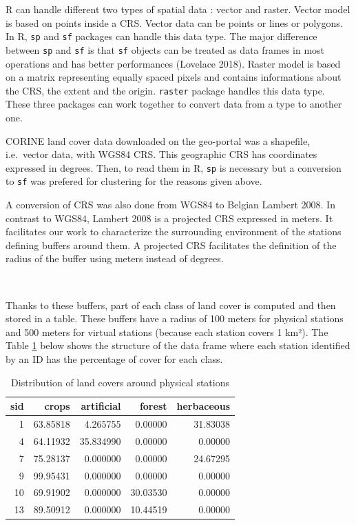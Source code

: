 \documentclass[12pt,twoside]{reedthesis}
\theoremstyle{definition}
\theoremstyle{definition}
\theoremstyle{definition}
\theoremstyle{remark}
\begin{document}
R can handle different two types of spatial data : vector and raster.
Vector model is based on points inside a CRS. Vector data can be points
or lines or polygons. In R, \texttt{sp} and \texttt{sf} packages can
handle this data type. The major difference between \texttt{sp} and
\texttt{sf} is that \texttt{sf} objects can be treated as data frames in
most operations and has better performances (Lovelace 2018). Raster
model is based on a matrix representing equally spaced pixels and
contains informations about the CRS, the extent and the origin.
\texttt{raster} package handles this data type. These three packages can
work together to convert data from a type to another one.

CORINE land cover data downloaded on the geo-portal was a shapefile,
i.e.~vector data, with WGS84 CRS. This geographic CRS has coordinates
expressed in degrees. Then, to read them in R, \texttt{sp} is necessary
but a conversion to \texttt{sf} was prefered for clustering for the
reasons given above.

A conversion of CRS was also done from WGS84 to Belgian Lambert 2008. In
contrast to WGS84, Lambert 2008 is a projected CRS expressed in meters.
It facilitates our work to characterize the surrounding environment of
the stations defining buffers around them. A projected CRS facilitates
the definition of the radius of the buffer using meters instead of
degrees.

~

Thanks to these buffers, part of each class of land cover is computed
and then stored in a table. These buffers have a radius of 100 meters
for physical stations and 500 meters for virtual stations (because each
station covers 1 km²). The Table \ref{tab:clcperc} below shows the
structure of the data frame where each station identified by an ID has
the percentage of cover for each class.
\begin{table}

\caption{\label{tab:clcperc}Distribution of land covers around physical stations}
\centering
\begin{tabular}[t]{rrrrr}
\toprule
\textbf{sid} & \textbf{crops} & \textbf{artificial} & \textbf{forest} & \textbf{herbaceous}\\
\midrule
1 & 63.85818 & 4.265755 & 0.00000 & 31.83038\\
4 & 64.11932 & 35.834990 & 0.00000 & 0.00000\\
7 & 75.28137 & 0.000000 & 0.00000 & 24.67295\\
9 & 99.95431 & 0.000000 & 0.00000 & 0.00000\\
10 & 69.91902 & 0.000000 & 30.03530 & 0.00000\\
13 & 89.50912 & 0.000000 & 10.44519 & 0.00000\\
\bottomrule
\end{tabular}
\end{table}
\end{document}
